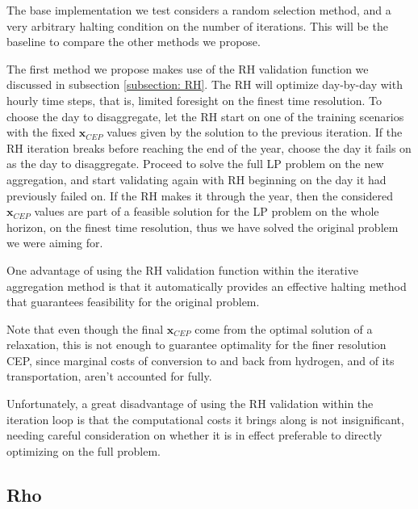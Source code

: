 The base implementation we test considers a random selection method, and a very arbitrary halting condition on the number of iterations. 
This will be the baseline to compare the other methods we propose.


The first method we propose makes use of the RH validation function we discussed in subsection \ref{subsection: RH}. 
The RH will optimize day-by-day with hourly time steps, that is, limited foresight on the finest time resolution. 
To choose the day to disaggregate, let the RH start on one of the training scenarios with the fixed $\mathbf{x}_{CEP}$ values given by the solution to the previous iteration. 
If the RH iteration breaks before reaching the end of the year, choose the day it fails on as the day to disaggregate. 
Proceed to solve the full LP problem on the new aggregation, and start validating again with RH beginning on the day it had previously failed on. 
If the RH makes it through the year, then the considered $\mathbf{x}_{CEP}$ values are part of a feasible solution for the LP problem on the whole horizon, on the finest time resolution, thus we have solved the original problem we were aiming for.

One advantage of using the RH validation function within the iterative aggregation method is that it automatically provides an effective halting method that guarantees feasibility for the original problem.

Note that even though the final $\mathbf{x}_{CEP}$ come from the optimal solution of a relaxation, this is not enough to guarantee optimality for the finer resolution CEP, since marginal costs of conversion to and back from hydrogen, and of its transportation, aren't accounted for fully. 

Unfortunately, a great disadvantage of using the RH validation within the iteration loop is that the computational costs it brings along is not insignificant, needing careful consideration on whether it is in effect preferable to directly optimizing on the full problem.

\subsection{Rho}\label{subsection: rho}  

